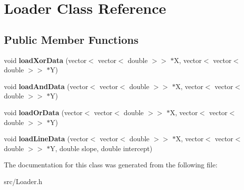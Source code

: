 \hypertarget{classLoader}{}\section{Loader Class Reference}
\label{classLoader}
\subsection*{Public Member Functions}
\begin{DoxyCompactItemize}
\item 
\mbox{\label{classLoader_a28f599170f85d5a6559e7d275bdfc471}} 
void {\bfseries load\+Xor\+Data} (vector$<$ vector$<$ double $>$$>$ $\ast$X, vector$<$ vector$<$ double $>$$>$ $\ast$Y)
\item 
\mbox{\label{classLoader_ab9a9faa7ab6d4d2631fba357cc9e32d7}} 
void {\bfseries load\+And\+Data} (vector$<$ vector$<$ double $>$$>$ $\ast$X, vector$<$ vector$<$ double $>$$>$ $\ast$Y)
\item 
\mbox{\label{classLoader_a832154eb1851cfae11c522625a0c0e13}} 
void {\bfseries load\+Or\+Data} (vector$<$ vector$<$ double $>$$>$ $\ast$X, vector$<$ vector$<$ double $>$$>$ $\ast$Y)
\item 
\mbox{\label{classLoader_a6b4cf73255792a49420c8cb2d5db484a}} 
void {\bfseries load\+Line\+Data} (vector$<$ vector$<$ double $>$$>$ $\ast$X, vector$<$ vector$<$ double $>$$>$ $\ast$Y, double slope, double intercept)
\end{DoxyCompactItemize}


The documentation for this class was generated from the following file\+:\begin{DoxyCompactItemize}
\item 
src/Loader.\+h\end{DoxyCompactItemize}
